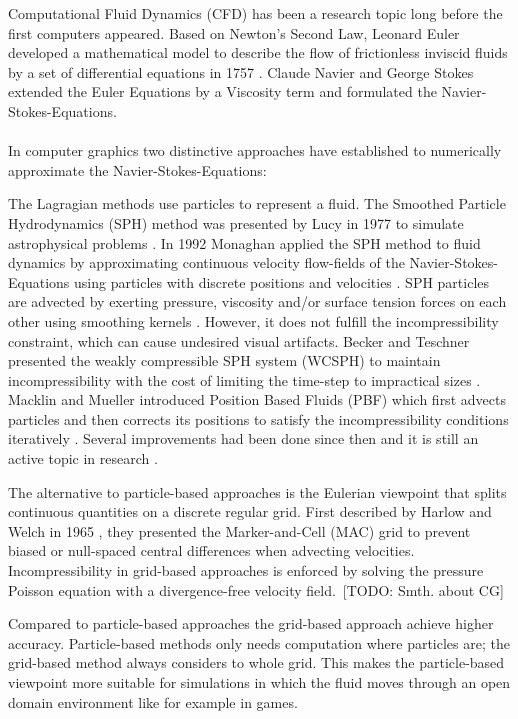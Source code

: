 Computational Fluid Dynamics (CFD) has been a research topic long before the first computers appeared. Based on Newton's Second Law, Leonard Euler developed a mathematical model to describe the flow of frictionless inviscid fluids by a set of differential equations in 1757 \parencite{euler1757principes}. Claude Navier and George Stokes extended the Euler Equations by a Viscosity term and formulated the Navier-Stokes-Equations. \\\\
In computer graphics two distinctive approaches have established to numerically approximate the Navier-Stokes-Equations: 
\par The Lagragian methods use particles to represent a fluid. The Smoothed Particle Hydrodynamics (SPH) method was presented by Lucy in 1977 to simulate astrophysical problems \parencite{lucy1977numerical}. In 1992 Monaghan applied the SPH method to fluid dynamics by approximating continuous velocity flow-fields of the Navier-Stokes-Equations using particles with discrete positions and velocities \parencite{monaghan1992smoothed}. SPH particles are advected by exerting pressure, viscosity and/or surface tension forces on each other using smoothing kernels \parencite{muller2003particle}. However, it does not fulfill the incompressibility constraint, which can cause undesired visual artifacts. Becker and Teschner presented the weakly compressible SPH system (WCSPH) to maintain incompressibility with the cost of limiting the time-step to impractical sizes \parencite{becker2007weakly}. Macklin and Mueller introduced Position Based Fluids (PBF) which first advects particles and then corrects its positions to satisfy the incompressibility conditions iteratively \parencite{macklin2013position}. Several improvements had been done since then and it is still an active topic in research \parencite{morikawaimprovements}.
\par The alternative to particle-based approaches is the Eulerian viewpoint that splits continuous quantities on a discrete regular grid. First described by Harlow and Welch in 1965 \parencite{harlow1965numerical}, they presented the Marker-and-Cell (MAC) grid to prevent biased or null-spaced central differences when advecting velocities. Incompressibility in grid-based approaches is enforced by solving the pressure Poisson equation with a divergence-free velocity field. [TODO: Smth. about CG]
\par Compared to particle-based approaches the grid-based approach achieve higher accuracy. Particle-based methods only needs computation where particles are; the grid-based method always considers to whole grid. This makes the particle-based viewpoint more suitable for simulations in which the fluid moves through an open domain environment like for example in games. 
